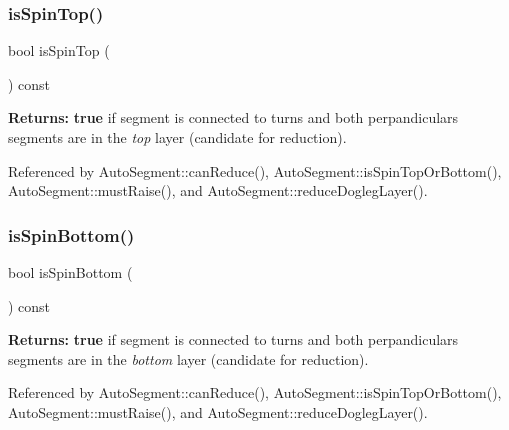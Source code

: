 \subsubsection{\texorpdfstring{is\+Spin\+Top()}{isSpinTop()}}
{\footnotesize\ttfamily bool is\+Spin\+Top (\begin{DoxyParamCaption}{ }\end{DoxyParamCaption}) const\hspace{0.3cm}{\ttfamily [inline]}}

{\bfseries Returns\+:} {\bfseries true} if segment is connected to turns and both perpandiculars segments are in the {\itshape top} layer (candidate for reduction). 

Referenced by Auto\+Segment\+::can\+Reduce(), Auto\+Segment\+::is\+Spin\+Top\+Or\+Bottom(), Auto\+Segment\+::must\+Raise(), and Auto\+Segment\+::reduce\+Dogleg\+Layer().

\mbox{\label{classKatabatic_1_1AutoSegment_ab786dbdb67ea727369b1a988497c01d1}} 
\subsubsection{\texorpdfstring{is\+Spin\+Bottom()}{isSpinBottom()}}
{\footnotesize\ttfamily bool is\+Spin\+Bottom (\begin{DoxyParamCaption}{ }\end{DoxyParamCaption}) const\hspace{0.3cm}{\ttfamily [inline]}}

{\bfseries Returns\+:} {\bfseries true} if segment is connected to turns and both perpandiculars segments are in the {\itshape bottom} layer (candidate for reduction). 

Referenced by Auto\+Segment\+::can\+Reduce(), Auto\+Segment\+::is\+Spin\+Top\+Or\+Bottom(), Auto\+Segment\+::must\+Raise(), and Auto\+Segment\+::reduce\+Dogleg\+Layer().

\mbox{\label{classKatabatic_1_1AutoSegment_a90d934f7275aed35f4ecb157c6950d6f}} 
